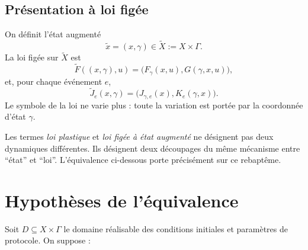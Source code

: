 \subsection{Présentation à loi figée}

On définit l'état augmenté
\[
\widetilde x=(x,\gamma)\in \widetilde X:=X\times\Gamma.
\]
La loi figée sur $\widetilde X$ est
\[
\widetilde F((x,\gamma),u)
=
\bigl(F_{\gamma}(x,u),G(\gamma,x,u)\bigr),
\]
et, pour chaque événement $e$,
\[
\widetilde J_e(x,\gamma)
=
\bigl(J_{\gamma,e}(x),K_e(\gamma,x)\bigr).
\]
Le symbole de la loi ne varie plus : toute la variation est portée par
la coordonnée d'état $\gamma$.

\begin{encadre}[title={Convention de présentation}]
Les termes \emph{loi plastique} et \emph{loi figée à état augmenté} ne
désignent pas deux dynamiques différentes. Ils désignent deux découpages
du même mécanisme entre ``état'' et ``loi''. L'équivalence ci-dessous
porte précisément sur ce rebaptême.
\end{encadre}

\section{Hypothèses de l'équivalence}
\label{annexe-K-hypotheses}

Soit $D\subseteq X\times\Gamma$ le domaine réalisable des conditions
initiales et paramètres de protocole. On suppose :

